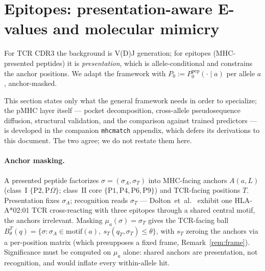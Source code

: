 \documentclass[11pt]{article}
\theoremstyle{oldplain}
\theoremstyle{oldrem}
\newcommand{\Pzero}{P_{0}}
\begin{document}
\section{Epitopes: presentation-aware E-values and molecular mimicry}\label{sec:epitope}

For TCR CDR3 the background is V(D)J generation; for epitopes (MHC-presented peptides) it is
\emph{presentation}, which is allele-conditional and constrains the anchor positions. We adapt the
framework with $\Pzero := \Pzero^{\mathrm{pep}}(\cdot\mid a)$ per allele $a$, anchor-masked.

This section states only what the general framework needs in order to specialize; the pMHC layer
itself --- pocket decomposition, cross-allele pseudosequence diffusion, structural validation, and
the comparison against trained predictors --- is developed in the companion \texttt{mhcmatch}
appendix, which defers its derivations to this document. The two agree; we do not restate them here.

\paragraph{Anchor masking.} A presented peptide factorizes $\sigma=(\sigma_A,\sigma_T)$ into
MHC-facing anchors $A(a,L)$ (class~I $\{\mathrm{P2},\mathrm{P}\Omega\}$; class~II core
$\{\mathrm{P1,P4,P6,P9}\}$) and TCR-facing positions $T$. Presentation fixes $\sigma_A$; recognition
reads $\sigma_T$ --- Dolton~et~al.~\cite{Dolton2023} exhibit one HLA-A*02:01 TCR cross-reacting with
three epitopes through a shared central motif, the anchors irrelevant. Masking $\mu_a(\sigma)=\sigma_T$
gives the TCR-facing ball
$B^T_\theta(q)=\{\sigma:\sigma_A\in\mathrm{motif}(a),\ s_T(q_T,\sigma_T)\le\theta\}$, with $s_T$
zeroing the anchors via a per-position matrix (which presupposes a fixed frame, Remark~\ref{rem:frame}).
Significance must be computed on $\mu_a$ alone: shared anchors are presentation, not recognition, and
would inflate every within-allele hit.
\end{document}
